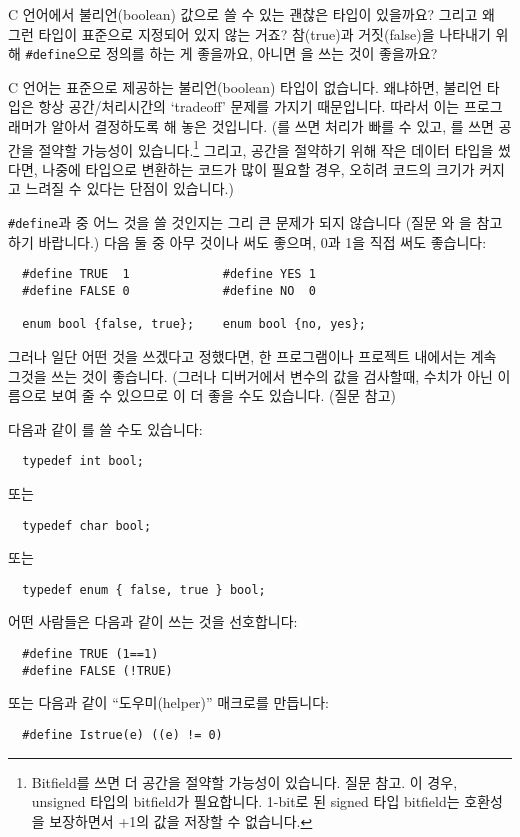 \begin{faq}
	C 언어에서 불리언(boolean) 값으로 쓸 수 있는 괜찮은 타입이 있을까요?
	그리고 왜 그런 타입이 표준으로 지정되어 있지 않는 거죠?
	참(true)과 거짓(false)을 나타내기 위해 \verb+#define+으로
	정의를 하는 게 좋을까요, 아니면 을 쓰는 것이 좋을까요?

\A
	C 언어는 표준으로 제공하는 불리언(boolean) 타입이 없습니다.
	왜냐하면, 불리언 타입은 항상 공간/처리시간의 `tradeoff' 문제를
	가지기 때문입니다.  따라서 이는 프로그래머가 알아서 결정하도록
	해 놓은 것입니다.  (를 쓰면 처리가 빠를 수 있고,
	를 쓰면 공간을 절약할 가능성이 있습니다.\footnote{Bitfield를
          쓰면 더 공간을 절약할 가능성이 있습니다. 질문  참고.
          이 경우, unsigned 타입의 bitfield가 필요합니다. 1-bit로 된 signed
          타입 bitfield는 호환성을 보장하면서 +1의 값을 저장할 수 없습니다.}
        그리고, 공간을 절약하기 위해 작은 데이터 타입을 썼다면, 나중에  
        타입으로 변환하는 코드가 많이 필요할 경우, 오히려 코드의 크기가 커지고
        느려질 수 있다는 단점이 있습니다.)

	\verb+#define+과  중 어느 것을 쓸 것인지는 그리 큰 문제가
	되지 않습니다 (질문 와 을 참고하기 바랍니다.)
	다음 둘 중 아무 것이나 써도 좋으며, 0과 1을 직접 써도 좋습니다:

\begin{verbatim}
  #define TRUE  1             #define YES 1
  #define FALSE 0             #define NO  0

  enum bool {false, true};    enum bool {no, yes};
\end{verbatim}
	\noindent 그러나 일단 어떤 것을 쓰겠다고 정했다면, 한 프로그램이나
	프로젝트 내에서는 계속 그것을 쓰는 것이 좋습니다.  (그러나 디버거에서
	변수의 값을 검사할때, 수치가 아닌 이름으로 보여 줄 수 있으므로
	이 더 좋을 수도 있습니다. (\note 질문  참고)

	다음과 같이 를 쓸 수도 있습니다:
\begin{verbatim}
  typedef int bool;
\end{verbatim}
	\noindent 또는
\begin{verbatim}
  typedef char bool;
\end{verbatim}
	\noindent 또는
\begin{verbatim}
  typedef enum { false, true } bool;
\end{verbatim}


	어떤 사람들은 다음과 같이 쓰는 것을 선호합니다:
\begin{verbatim}
  #define TRUE (1==1)
  #define FALSE (!TRUE)
\end{verbatim}
	\noindent 또는 다음과 같이 ``도우미(helper)'' 매크로를 만듭니다:
\begin{verbatim}
  #define Istrue(e) ((e) != 0)
\end{verbatim}


\end{faq}

